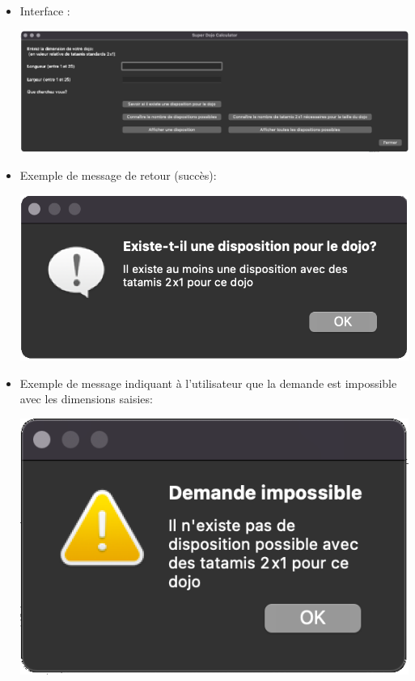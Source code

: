 \begin{itemize}


    \item Interface :

          \begin{center}
              \includegraphics[width=16cm]{images/betaInterface.png}
          \end{center}


    \item Exemple de message de retour (succès):

          \begin{center}
              \includegraphics[scale=0.25]{images/betaRetourSucces.png}
          \end{center}

\newpage
    \item Exemple de message indiquant à l’utilisateur que la demande est impossible avec les dimensions saisies:
          \begin{center}
              \includegraphics[scale=0.25]{images/betaImpossible.png}
          \end{center}



\end{itemize}
